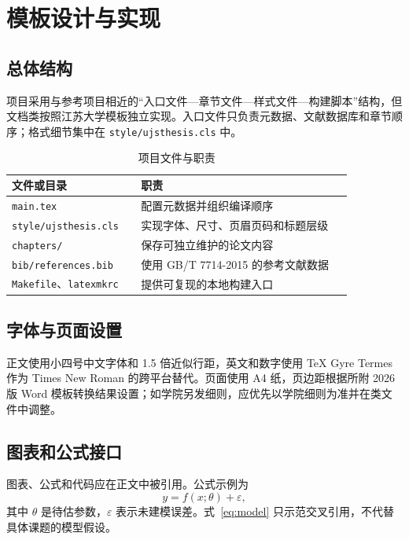 \chapter{模板设计与实现}

\section{总体结构}
项目采用与参考项目相近的“入口文件—章节文件—样式文件—构建脚本”结构，但文档类按照江苏大学模板独立实现。入口文件只负责元数据、文献数据库和章节顺序；格式细节集中在 \texttt{style/ujsthesis.cls} 中。

\begin{table}[H]
  \centering
  \caption{项目文件与职责}
  \begin{tabular}{p{0.30\linewidth}p{0.56\linewidth}}
    \toprule
    文件或目录 & 职责 \\
    \midrule
    \texttt{main.tex} & 配置元数据并组织编译顺序 \\
    \texttt{style/ujsthesis.cls} & 实现字体、尺寸、页眉页码和标题层级 \\
    \texttt{chapters/} & 保存可独立维护的论文内容 \\
    \texttt{bib/references.bib} & 使用 GB/T 7714-2015 的参考文献数据 \\
    \texttt{Makefile}、\texttt{latexmkrc} & 提供可复现的本地构建入口 \\
    \bottomrule
  \end{tabular}
\end{table}

\section{字体与页面设置}
正文使用小四号中文字体和 1.5 倍近似行距，英文和数字使用 TeX Gyre Termes 作为 Times New Roman 的跨平台替代。页面使用 A4 纸，页边距根据所附 2026 版 Word 模板转换结果设置；如学院另发细则，应优先以学院细则为准并在类文件中调整。

\section{图表和公式接口}
图表、公式和代码应在正文中被引用。公式示例为
\begin{equation}
  y = f(x;\theta) + \varepsilon,
  \label{eq:model}
\end{equation}
其中 $\theta$ 是待估参数，$\varepsilon$ 表示未建模误差。式~\eqref{eq:model} 只示范交叉引用，不代替具体课题的模型假设。
